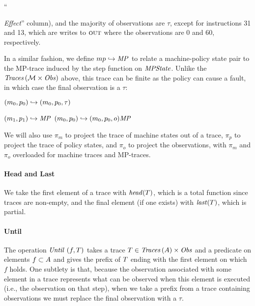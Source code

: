 \documentclass[acmsmall,review,anonymous]{acmart}\settopmatter{printfolios=true,printccs=false,printacmref=false}
\begin{document}
``{\textit{Effect}'' column), and the majority of observations are $\tau$, except
for instructions 31 and 13, which are writes to $\textsc{out}$
where the observations are $0$ and $60$, respectively.

In a similar fashion, we define \(mp \hookrightarrow \mathit{MP}\)
to relate a machine-policy state pair to the MP-trace
induced by the step function on $\mathit{MPState}$. Unlike the $\mathit{Traces}\,({\mathcal M} \times \mathit{Obs})$ above, this trace can
be finite as the policy can cause a fault, in which case the final observation is
a \(\tau\):

\begin{minipage}{.4\textwidth}
         {\((m_0,p_0) \hookrightarrow (m_0,p_0,\tau)\)}
\end{minipage}
\begin{minipage}{.55\textwidth}
              {\((m_1,p_1) \hookrightarrow \mathit{MP}\)}
              {\((m_0,p_0) \hookrightarrow
                 (m_0,p_0,o) \mathit{MP}\)}
\end{minipage}

We will also use \(\pi_m\) to project the trace of machine states
out of a trace, \(\pi_p\) to project the trace of policy states, and
\(\pi_o\) to project the observations, with \(\pi_m\) and \(\pi_o\) overloaded
for machine traces and MP-traces.

\paragraph*{Head and Last}

We take the first element of a trace with \(\mathit{head}(T)\), which is a total
function since traces are non-empty, and the final element (if one exists) with
\(\mathit{last}(T)\), which is partial.

\paragraph*{Until}
The operation \(\mathit{Until}~(f,T)\)
takes a trace
\(T \in \mathit{Traces}\,(A) \times \mathit{Obs}\) and a predicate
on elements \(f \subset A\) and gives the prefix of
\(T\) ending with the first element on which \(f\) holds.
One subtlety is that, because the observation associated with some element
in a trace
represents what can be observed when this element is executed (i.e., the
observation on that step), when we take a prefix from a trace containing
observations
we must replace the final observation with a \(\tau\).

}
\end{document}

